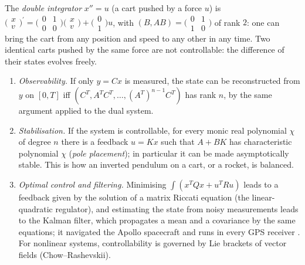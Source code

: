 \begin{example}\label{ordinary-differential-equations:example-control}
The \emph{double integrator} $x'' = u$ (a cart pushed by a force $u$) is $\bigl(\begin{smallmatrix}x\\ v\end{smallmatrix}\bigr)^{\prime} = \bigl(\begin{smallmatrix}0 & 1\\ 0 & 0\end{smallmatrix}\bigr)\bigl(\begin{smallmatrix}x\\ v\end{smallmatrix}\bigr) + \bigl(\begin{smallmatrix}0\\ 1\end{smallmatrix}\bigr)u$, with
$(B, AB) = \bigl(\begin{smallmatrix}0 & 1\\ 1 & 0\end{smallmatrix}\bigr)$ of rank $2$: one can bring the cart from any position and speed to any other in any time. Two identical carts pushed by the same force are not controllable: the
difference of their states evolves freely.
\end{example}

\begin{remark}\label{ordinary-differential-equations:remark-control}
\begin{enumerate}
\item \emph{Observability.} If only $y = Cx$ is measured, the state can be reconstructed from $y$ on $[0, T]$ iff $(C^T, A^TC^T, \ldots, (A^T)^{n-1}C^T)$ has rank $n$, by the same argument applied to the dual system.
\item \emph{Stabilisation.} If the system is controllable, for every monic real polynomial $\chi$ of degree $n$ there is a feedback $u = Kx$ such that $A + BK$ has characteristic polynomial $\chi$ (\emph{pole placement}); in particular it can be
made asymptotically stable. This is how an inverted pendulum on a cart, or a rocket, is balanced.
\item \emph{Optimal control and filtering.} Minimising $\int(x^TQx + u^TRu)$ leads to a feedback given by the solution of a matrix Riccati equation (the linear-quadratic regulator), and estimating the state from noisy measurements
leads to the Kalman filter, which propagates a mean and a covariance by the same equations; it navigated the Apollo spacecraft and runs in every GPS receiver \cite{sontag-control}. For nonlinear systems, controllability is
governed by Lie brackets of vector fields (Chow--Rashevskii).
\end{enumerate}
\end{remark}

